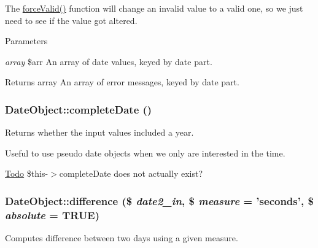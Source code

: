 The \hyperlink{classDateObject_a6dfed6663a0da8662e3cbfa1886d8396}{forceValid()} function will change an invalid value to a valid one, so we just need to see if the value got altered.


\begin{DoxyParams}{Parameters}
\item[{\em array}]\$arr An array of date values, keyed by date part.\end{DoxyParams}
\begin{DoxyReturn}{Returns}
array An array of error messages, keyed by date part. 
\end{DoxyReturn}
\hypertarget{classDateObject_af83b95282617a2d2ec4dded415f84ed7}{
\subsubsection[{completeDate}]{\setlength{\rightskip}{0pt plus 5cm}DateObject::completeDate ()}}
\label{classDateObject_af83b95282617a2d2ec4dded415f84ed7}
Returns whether the input values included a year.

Useful to use pseudo date objects when we only are interested in the time.

\begin{Desc}
\item[\hyperlink{todo__todo000020}{Todo}]\$this-\/$>$completeDate does not actually exist? \end{Desc}
\hypertarget{classDateObject_a58a7653254c911f52b506e028b5bc35a}{
\subsubsection[{difference}]{\setlength{\rightskip}{0pt plus 5cm}DateObject::difference (\$ {\em date2\_\-in}, \/  \$ {\em measure} = {\ttfamily 'seconds'}, \/  \$ {\em absolute} = {\ttfamily TRUE})}}
\label{classDateObject_a58a7653254c911f52b506e028b5bc35a}
Computes difference between two days using a given measure.


